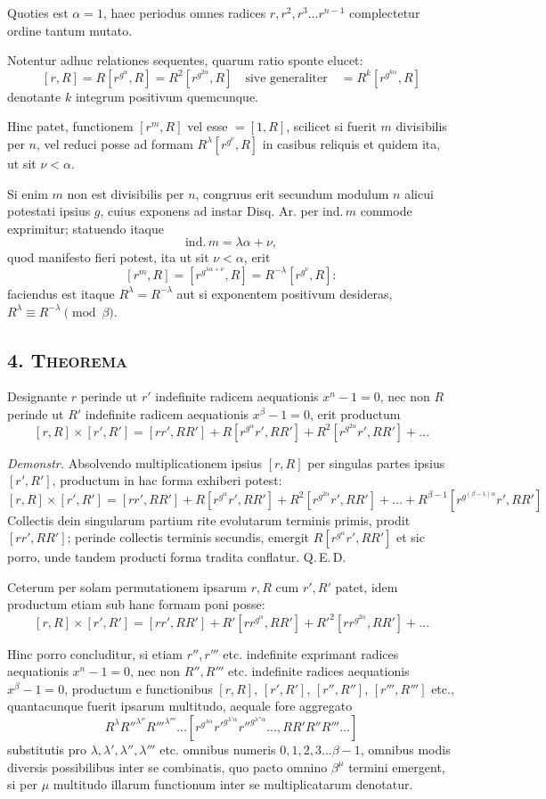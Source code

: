\documentclass[12pt,a4paper]{article}
\begin{document}
Quoties est $\alpha=1$, haec periodus omnes radices $r, r^2, r^3\ldots r^{n-1}$ complectetur ordine tantum mutato.

Notentur adhuc relationes sequentes, quarum ratio sponte elucet:
\[
[r,R] = R[r^{g^\alpha}, R] = R^2[r^{g^{2\alpha}}, R] \quad\text{sive generaliter}\quad = R^k[r^{g^{k\alpha}}, R]
\]
denotante $k$ integrum positivum quemcunque.

Hinc patet, functionem $[r^m, R]$ vel esse $=[1,R]$, scilicet si fuerit $m$ divisibilis per $n$, vel reduci posse ad formam $R^\lambda[r^{g^\nu}, R]$ in casibus reliquis et quidem ita, ut sit $\nu<\alpha$.

Si enim $m$ non est divisibilis per $n$, congruus erit secundum modulum $n$ alicui potestati ipsius $g$, cuius exponens ad instar Disq. Ar. per ind.\,$m$ commode exprimitur; statuendo itaque
\[
\text{ind.}\,m = \lambda\alpha + \nu,
\]
quod manifesto fieri potest, ita ut sit $\nu<\alpha$, erit
\[
[r^m, R] = [r^{g^{\lambda\alpha+\nu}}, R] = R^{-\lambda}[r^{g^\nu}, R]:
\]
faciendus est itaque $R^\lambda = R^{-\lambda}$ aut si exponentem positivum desideras, $R^\lambda \equiv R^{-\lambda} \pmod{\beta}$.

\subsection*{4. \textsc{Theorema}}

Designante $r$ perinde ut $r'$ indefinite radicem aequationis $x^n-1=0$, nec non $R$ perinde ut $R'$ indefinite radicem aequationis $x^\beta-1=0$, erit productum
\[
[r,R] \times [r',R'] = [rr', RR'] + R[r^{g^\alpha}r', RR'] + R^2[r^{g^{2\alpha}}r', RR'] + \ldots
\]

\textit{Demonstr.} Absolvendo multiplicationem ipsius $[r,R]$ per singulas partes ipsius $[r',R']$, productum in hac forma exhiberi potest:
\[
[r,R] \times [r',R'] = [rr', RR'] + R[r^{g^\alpha}r', RR'] + R^2[r^{g^{2\alpha}}r', RR'] + \ldots + R^{\beta-1}[r^{g^{(\beta-1)\alpha}}r', RR']
\]
Collectis dein singularum partium rite evolutarum terminis primis, prodit $[rr', RR']$; perinde collectis terminis secundis, emergit $R[r^{g^\alpha}r', RR']$ et sic porro, unde tandem producti forma tradita conflatur. Q.\,E.\,D.

Ceterum per solam permutationem ipsarum $r, R$ cum $r', R'$ patet, idem productum etiam sub hanc formam poni posse:
\[
[r,R] \times [r',R'] = [rr', RR'] + R'[rr^{g^\alpha}, RR'] + R'^2[rr^{g^{2\alpha}}, RR'] + \ldots
\]

Hinc porro concluditur, si etiam $r'', r'''$ etc. indefinite exprimant radices aequationis $x^n-1=0$, nec non $R'', R'''$ etc. indefinite radices aequationis $x^\beta-1=0$, productum e functionibus $[r,R]$, $[r',R']$, $[r'',R'']$, $[r''',R''']$ etc., quantacunque fuerit ipsarum multitudo, aequale fore aggregato
\[
R^{\lambda}R''^{\lambda''}R'''^{\lambda'''}\ldots [r^{g^{\lambda\alpha}}r'^{g^{\lambda'\alpha}}r''^{g^{\lambda''\alpha}}\ldots, RR'R''R'''\ldots]
\]
substitutis pro $\lambda, \lambda', \lambda'', \lambda'''$ etc. omnibus numeris $0, 1, 2, 3\ldots \beta-1$, omnibus modis diversis possibilibus inter se combinatis, quo pacto omnino $\beta^\mu$ termini emergent, si per $\mu$ multitudo illarum functionum inter se multiplicatarum denotatur.
\end{document}
